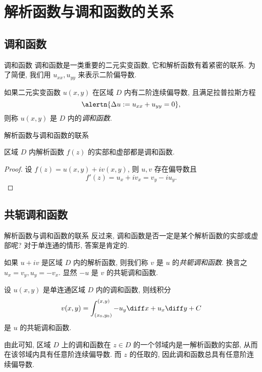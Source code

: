 \section{解析函数与调和函数的关系}


\subsection{调和函数}

\begin{frame}{调和函数}
	\onslide<+->
	调和函数是一类重要的二元实变函数, 它和解析函数有着紧密的联系.
	\onslide<+->
	为了简便, 我们用 $u_{xx},u_{yy}$ 来表示二阶偏导数.

	\onslide<+->
	\begin{definition}
		如果二元实变函数 $u(x,y)$ 在区域 $D$ 内有二阶连续偏导数, 且满足拉普拉斯方程
		\[\alertn{\Delta u:=u_{xx}+u_{yy}=0},\]
		则称 $u(x,y)$ 是 $D$ 内的\emph{调和函数}.
	\end{definition}
\end{frame}


\begin{frame}{解析函数与调和函数的联系}
	\onslide<+->
	\begin{theorem}
		区域 $D$ 内解析函数 $f(z)$ 的实部和虚部都是调和函数.
	\end{theorem}

	\onslide<+->
	\begin{proof}
		设 $f(z)=u(x,y)+iv(x,y)$, 则 $u,v$ 存在偏导数且
			\[f'(z)=u_x+iv_x=v_y-iu_y.\]
		\onslide<+->{可知
			\[\Delta u=u_{xx}+u_{yy}=v_{yx}-v_{xy}=0,\]}
			\vspace{-\baselineskip}
		\onslide<+->{
			\[\Delta v=v_{xx}+v_{yy}=-u_{yx}+u_{xy}=0.\qedhere\]}
		\vspace{-\baselineskip}
	\end{proof}
\end{frame}


\subsection{共轭调和函数}
\begin{frame}{解析函数与调和函数的联系}
	\onslide<+->
	反过来, 调和函数是否一定是某个解析函数的实部或虚部呢?
	\onslide<+->
	对于单连通的情形, 答案是肯定的.

	\onslide<+->
	如果 $u+iv$ 是区域 $D$ 内的解析函数, 则我们称 $v$ 是 $u$ 的\emph{共轭调和函数}.
	\onslide<+->
	换言之 $u_x=v_y,u_y=-v_x$.
	\onslide<+->
	显然 $-u$ 是 $v$ 的共轭调和函数.
	\onslide<+->
	\begin{theorem}
		设 $u(x,y)$ 是单连通区域 $D$ 内的调和函数, 则线积分
		\[v(x,y)=\int_{(x_0,y_0)}^{(x,y)}-u_y\diff x+u_x\diff y+C\]
		是 $u$ 的共轭调和函数.
	\end{theorem}
	\onslide<+->
	由此可知, 区域 $D$ 上的调和函数在 $z\in D$ 的一个邻域内是一解析函数的实部, 从而在该邻域内具有任意阶连续偏导数.
	\onslide<+->
	而 $z$ 的任取的, 因此调和函数总具有任意阶连续偏导数.
\end{frame}


